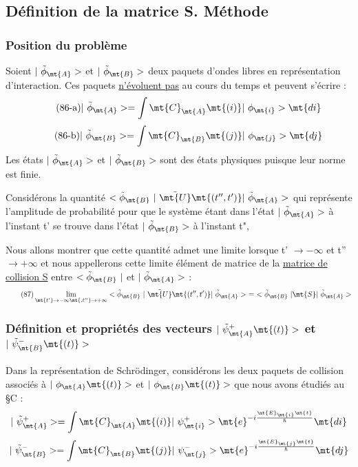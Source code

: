 \subsection{Définition de la matrice S. Méthode}%
\subsubsection{Position du problème}%
Soient $|\ \tilde{\phi}_\mt{A}>$ et $|\ \tilde{\phi}_\mt{B}>$ deux paquets d'ondes libres
en représentation d'interaction. Ces paquets \ul{n'évoluent pas} au
cours du temps et peuvent s'écrire :
\[
\tag{86-a}|\ \tilde{\phi}_\mt{A}>=\int\mt{C}_\mt{A}\mt{(i) }|\ \phi_\mt{i}>\mt{di}
\]
\[
\tag{86-b}|\ \tilde{\phi}_\mt{B}>=\int\mt{C}_\mt{B}\mt{(j) }|\ \phi_\mt{j}>\mt{dj}
\]
Les états $|\ \tilde{\phi}_\mt{A}>$ et $|\ \tilde{\phi}_\mt{B}>$ sont des états physiques puisque leur
norme est finie.

Considérons la quantité $<\tilde{\phi}_\mt{B}\ |\ \tilde{\mt{U}}\mt{(t'', t') }|\ \tilde{\phi}_\mt{A}>$
qui représente l'amplitude de probabilité pour que le système
étant dans l'état $|\ \tilde{\phi}_\mt{A}>$ à l'instant t' se trouve dans l'état
$|\ \tilde{\phi}_\mt{B}>$ à l'instant t",

Nous allons montrer que cette quantité admet une
limite lorsque t' $\to-\infty$ et t'' $\to+\infty$ et nous appellerons cette
limite élément de matrice de la \ul{matrice de collision S} entre
$<\tilde{\phi}_\mt{B}\ |$ et $|\ \tilde{\phi}_\mt{A}>$ :
\[
\tag{87}\lim_{\mt{t'}\to-\infty\mt{, t''}\to+\infty}
<\tilde{\phi}_\mt{B}\ |\ \tilde{\mt{U}}\mt{(t'', t') }|\ \tilde{\phi}_\mt{A}>\ =
\ <\tilde{\phi}_\mt{B}\ |\mt{ S }|\ \tilde{\phi}_\mt{A}>
\]


\subsubsection{Définition et propriétés des vecteurs $|\ \tilde{\psi}_\mt{A}^+\mt{(t)}>$
 et $|\ \tilde{\psi}_\mt{B}^-\mt{(t)}>$}%
Dans la \ul{}représentation de Schrödinger, considérons les deux
paquets de collision associés à $|\ \phi_\mt{A}\mt{(t)}>$ et $|\ \phi_\mt{B}\mt{(t)}>$ que nous avons
étudiés au \S C :
\[
|\ \tilde{\psi}_\mt{A}^+>=\int\mt{C}_\mt{A}\mt{(i) }|\ \psi_\mt{i}^+>
\mt{ e}^{-i\frac{\mt{E}_\mt{i}\mt{t}}{\hbar}}\mt{ di}
\]
\[
|\ \tilde{\psi}_\mt{B}^->=\int\mt{C}_\mt{B}\mt{(j) }|\ \psi_\mt{j}^->
\mt{ e}^{-i\frac{\mt{E}_\mt{j}\mt{t}}{\hbar}}\mt{ dj}
\]

